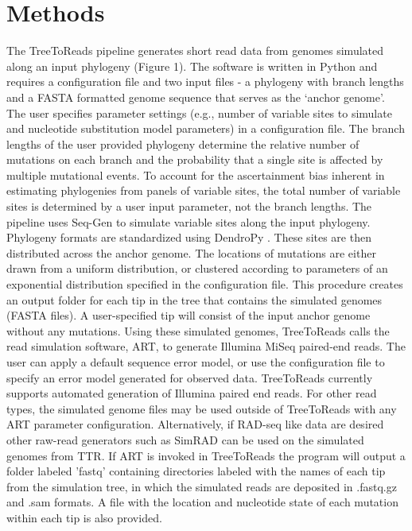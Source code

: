 \section*{Methods}
The TreeToReads pipeline generates short read data from genomes simulated along an input phylogeny (Figure 1).
The software is written in Python and requires a configuration file and two input files - a phylogeny with branch lengths and a FASTA formatted genome sequence that serves as the `anchor genome'.
The user specifies parameter settings (e.g., number of variable sites to simulate and nucleotide substitution model parameters) in a configuration file.
The branch lengths of the user provided phylogeny determine the relative number of mutations on each branch and the probability that a single site is affected by multiple mutational events.
To account for the ascertainment bias inherent in estimating phylogenies from panels of variable sites, the total number of variable sites is determined by a user input parameter, not the branch lengths.
The pipeline uses Seq-Gen \citep{rambaut_seq-gen:_1997} to simulate variable sites along the input phylogeny.
Phylogeny formats are standardized using DendroPy \cite{sukumaran_dendropy:_2010}.
These sites are then distributed across the anchor genome. 
The locations of mutations are either drawn from a uniform distribution, or clustered according to parameters of an exponential distribution specified in the configuration file.
This procedure creates an output folder for each tip in the tree that contains the simulated genomes (FASTA files).
A user-specified tip will consist of the input anchor genome without any mutations.
Using these simulated genomes, TreeToReads calls the read simulation software, ART, \citep{huang_art:_2012} to generate Illumina MiSeq paired-end reads.
The user can apply a default sequence error model, or use the configuration file to specify an error model generated for observed data.
TreeToReads currently supports automated generation of Illumina paired end reads.
For other read types, the simulated genome files may be used outside of TreeToReads with any ART parameter configuration.
Alternatively, if RAD-seq like data are desired other raw-read generators such as SimRAD \citep{lepais_simrad:_2014} can be used on the simulated genomes from TTR.
If ART is invoked in TreeToReads the program will output a folder labeled 'fastq'
containing directories labeled with the names of each tip from the simulation tree, in which the simulated reads are deposited in .fastq.gz and .sam formats.
A file with the location and nucleotide state of each mutation within each tip is also provided. 


